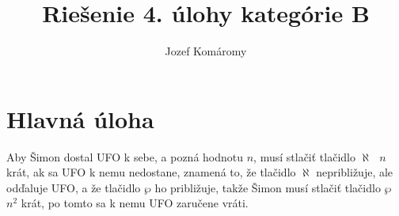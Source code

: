 \documentclass{article}
\begin{document}
\title{Riešenie 4. úlohy kategórie B}
\author{Jozef Komáromy}
\maketitle

\section{Hlavná úloha}
Aby Šimon dostal UFO k sebe, a pozná hodnotu \(n\), musí stlačiť tlačidlo \(\aleph \text{ } n\) krát, ak sa UFO k nemu nedostane, znamená to, že tlačidlo \(\aleph\) nepribližuje, ale odďaluje UFO, a že tlačidlo \(\wp\) ho približuje, takže Šimon musí stlačiť tlačidlo \(\wp\) \(n ^ 2\) krát, po tomto sa k nemu UFO zaručene vráti.
\end{document}
